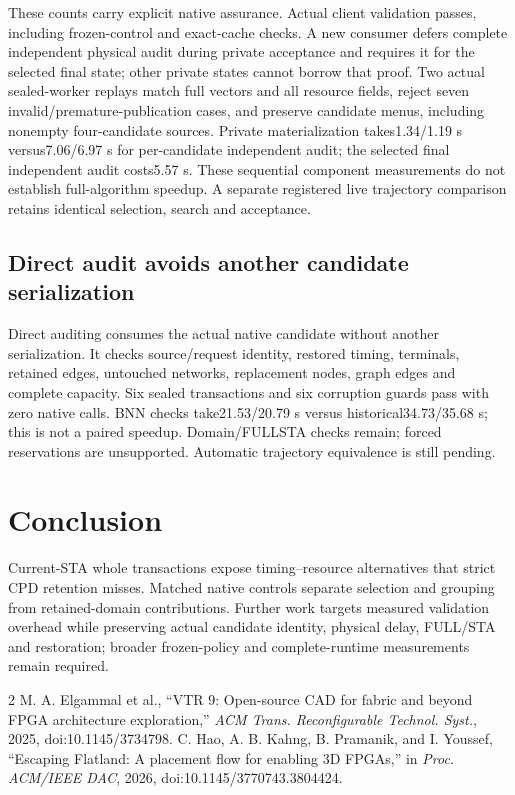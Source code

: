 \documentclass[conference,10pt]{IEEEtran}
\begin{document}
These counts carry explicit native assurance. Actual client validation passes, including frozen-control and exact-cache checks. A new consumer defers complete independent physical audit during private acceptance and requires it for the selected final state; other private states cannot borrow that proof. Two actual sealed-worker replays match full vectors and all resource fields, reject seven invalid/premature-publication cases, and preserve candidate menus, including nonempty four-candidate sources. Private materialization takes1.34/1.19 s versus7.06/6.97 s for per-candidate independent audit; the selected final independent audit costs5.57 s. These sequential component measurements do not establish full-algorithm speedup. A separate registered live trajectory comparison retains identical selection, search and acceptance.

\subsection{Direct audit avoids another candidate serialization}
Direct auditing consumes the actual native candidate without another serialization. It checks source/request identity, restored timing, terminals, retained edges, untouched networks, replacement nodes, graph edges and complete capacity. Six sealed transactions and six corruption guards pass with zero native calls. BNN checks take21.53/20.79 s versus historical34.73/35.68 s; this is not a paired speedup. Domain/FULLSTA checks remain; forced reservations are unsupported. Automatic trajectory equivalence is still pending.

\section{Conclusion}
Current-STA whole transactions expose timing--resource alternatives that strict CPD retention misses. Matched native controls separate selection and grouping from retained-domain contributions. Further work targets measured validation overhead while preserving actual candidate identity, physical delay, FULL/STA and restoration; broader frozen-policy and complete-runtime measurements remain required.

\begin{thebibliography}{2}
 M. A. Elgammal et al., ``VTR 9: Open-source CAD for fabric and beyond FPGA architecture exploration,'' \emph{ACM Trans. Reconfigurable Technol. Syst.}, 2025, doi:10.1145/3734798.
 C. Hao, A. B. Kahng, B. Pramanik, and I. Youssef, ``Escaping Flatland: A placement flow for enabling 3D FPGAs,'' in \emph{Proc. ACM/IEEE DAC}, 2026, doi:10.1145/3770743.3804424.
\end{thebibliography}
\end{document}
